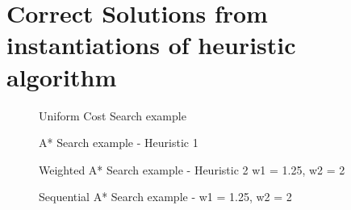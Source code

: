 \section{Correct Solutions from instantiations of heuristic algorithm}

\begin{figure}[H]
	\centering
	\caption{Uniform Cost Search example}
	\label{fig: Uniform Cost Search Path Trace}
\end{figure}

\begin{figure}[H]
	\centering
	\caption{A* Search example - Heuristic 1}
	\label{fig: A* Search Path Trace H2}
\end{figure}

\begin{figure}[H]
	\centering
	\caption{Weighted A* Search example - Heuristic 2 w1 = 1.25, w2 = 2}
	\label{fig: Weighted A* Search Path Trace }
\end{figure}

\begin{figure}[H]
	\centering
	\caption{Sequential A* Search example - w1 = 1.25, w2 = 2}
	\label{fig: Sequential A* Search Path Trace }
\end{figure}
